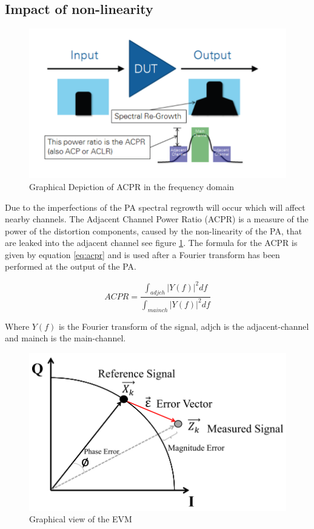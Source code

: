 \subsection{Impact of non-linearity}
\begin{figure}[H]
\centering 
\includegraphics[scale = 0.5]{figures/ch1/acpr.png}
\caption{Graphical Depiction of ACPR in the frequency domain \citep{NI}}
\label{fig:acpr}
\end{figure}

Due to the imperfections of the PA spectral regrowth will occur which will affect nearby channels. The Adjacent Channel Power Ratio (ACPR) is a measure of the power of the distortion components, caused by the non-linearity of the PA, that are leaked into the adjacent channel see figure \ref{fig:acpr}. The formula for the ACPR is given by equation \ref{eq:acpr} and is used after a Fourier transform has been performed at the output of the PA.

\begin{equation} \label{eq:acpr}
	ACPR = \frac{\int_{adjch}^{} |Y(f)|^2 df }{\int_{mainch}^{} |Y(f)|^2 df}
\end{equation}   

Where $Y(f)$ is the Fourier transform of the signal, adjch is the adjacent-channel and mainch is the main-channel. 

\begin{figure}[H]
\centering 
\includegraphics[scale = 0.8]{figures/ch1/evm.png}
\caption{Graphical view of the EVM}
\label{fig:evm}
\end{figure}
  
